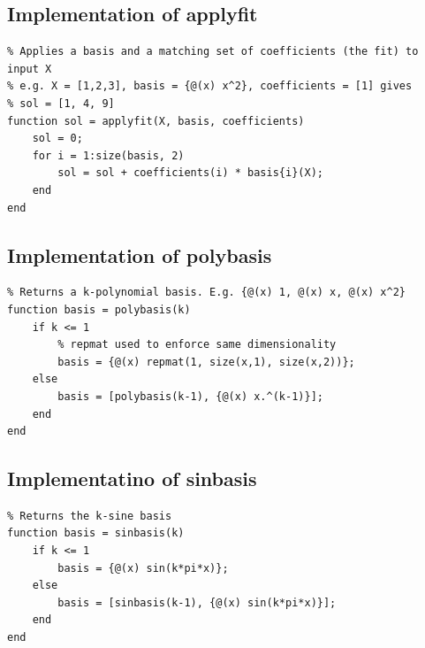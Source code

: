 \documentclass[11pt]{article}
\begin{document}
    \subsection{Implementation of applyfit}
        \begin{lstlisting}
% Applies a basis and a matching set of coefficients (the fit) to input X
% e.g. X = [1,2,3], basis = {@(x) x^2}, coefficients = [1] gives
% sol = [1, 4, 9] 
function sol = applyfit(X, basis, coefficients)
    sol = 0;
    for i = 1:size(basis, 2)
        sol = sol + coefficients(i) * basis{i}(X);
    end
end\end{lstlisting}
    
    \subsection{Implementation of polybasis}
        \begin{lstlisting}
% Returns a k-polynomial basis. E.g. {@(x) 1, @(x) x, @(x) x^2}
function basis = polybasis(k)
    if k <= 1
        % repmat used to enforce same dimensionality
        basis = {@(x) repmat(1, size(x,1), size(x,2))}; 
    else
        basis = [polybasis(k-1), {@(x) x.^(k-1)}];
    end
end\end{lstlisting}
    
    \subsection{Implementatino of sinbasis} \label{appendix:sinbasis}
        \begin{lstlisting}
% Returns the k-sine basis 
function basis = sinbasis(k)
    if k <= 1
        basis = {@(x) sin(k*pi*x)}; 
    else
        basis = [sinbasis(k-1), {@(x) sin(k*pi*x)}];
    end
end\end{lstlisting}
\end{document}
